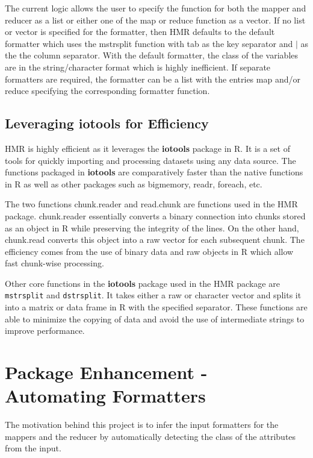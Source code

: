 \documentclass[11pt]{book}
\newcommand{\code}[1]{\texttt{#1}}
\newcommand{\pkg}[1]{\textsf{ \bf #1}}
\newcommand{\R}{\textsf{R}}
\begin{document}
The current logic allows the user to specify the function for both the mapper and reducer as a list or either one of the map or reduce function as a vector. If no list or vector is specified for the formatter, then HMR defaults to the default formatter which uses the mstrsplit function with tab as the key separator and $\mid$ as the the column separator. With the default formatter, the class of the variables are in the string/character format which is highly inefficient. If separate formatters are required, the formatter can be a list with the entries map and/or reduce specifying the corresponding formatter function. 

\section{Leveraging\pkg{iotools} for Efficiency}

HMR is highly efficient as it leverages the \pkg{iotools} package in \R. It is a set of tools for quickly importing and processing datasets using any data source. The functions packaged in \pkg{iotools} are comparatively faster than the native functions in R as well as other packages such as bigmemory, readr, foreach, etc. 

The two functions chunk.reader and read.chunk are functions used in the HMR package. chunk.reader essentially converts a binary connection into chunks stored as an object in R while preserving the integrity of the lines. On the other hand, chunk.read converts this object into a raw vector for each subsequent chunk. The efficiency comes from the use of binary data and raw objects in R which allow fast chunk-wise processing. 

Other core functions in the \pkg{iotools} package used in the HMR package are \code{mstrsplit} and \code{dstrsplit}. It takes either a raw or character vector and splits it into a matrix or data frame in R with the specified separator. These functions are able to minimize the copying of data and avoid the use of intermediate strings to improve performance.


\chapter{Package Enhancement - Automating Formatters}

The motivation behind this project is to infer the input formatters for the mappers and the reducer by automatically detecting the class of the attributes from the input. 
\end{document}

